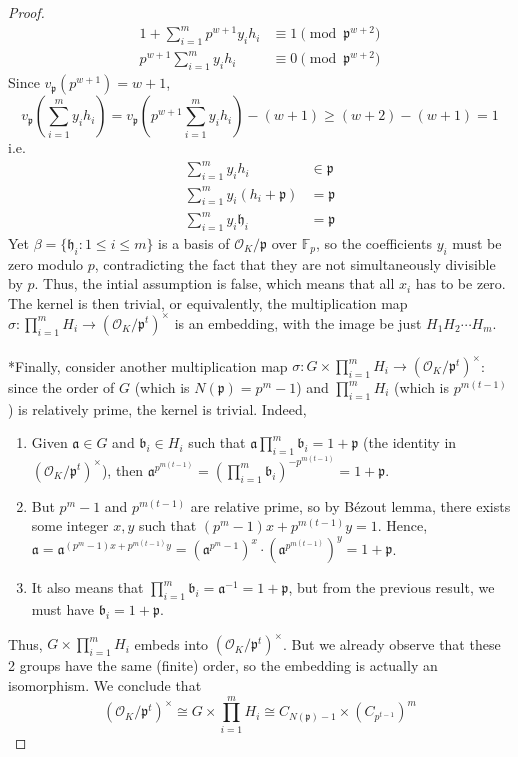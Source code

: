 \documentclass{treatise}
\begin{document}
\begin{proof}
\begin{align*}
1 + \sum_{i = 1}^m p^{w + 1} y_i h_i & \equiv 1 \pmod{\mathfrak{p}^{w + 2}} \\
p^{w + 1} \sum_{i = 1}^m y_i h_i & \equiv 0 \pmod{\mathfrak{p}^{w + 2}}
\end{align*}
Since $v_\mathfrak{p}(p^{w + 1}) = w + 1$,
$$v_\mathfrak{p} \left( \sum_{i = 1}^m y_i h_i \right) = v_\mathfrak{p} \left( p^{w + 1} \sum_{i = 1}^m y_i h_i \right) - (w + 1) \geq (w + 2) - (w + 1) = 1$$
i.e.
\begin{align*}
\sum_{i = 1}^m y_i h_i & \in \mathfrak{p} \\
\sum_{i = 1}^m y_i (h_i + \mathfrak{p}) & = \mathfrak{p} \\
\sum_{i = 1}^m y_i \mathfrak{h}_i & = \mathfrak{p}
\end{align*}
Yet $\beta = \{ \mathfrak{h}_i : 1 \leq i \leq m \}$ is a basis of $\mathcal{O}_K / \mathfrak{p}$ over $\mathbb{F}_p$, so the coefficients $y_i$ must be zero modulo $p$, contradicting the fact that they are not simultaneously divisible by $p$. Thus, the intial assumption is false, which means that all $x_i$ has to be zero. The kernel is then trivial, or equivalently, the multiplication map $\sigma: \prod_{i = 1}^m H_i \to (\mathcal{O}_K/\mathfrak{p}^t)^\times$ is an embedding, with the image be just $H_1 H_2 \cdots H_m$.
\\
\\
*Finally, consider another multiplication map $\sigma: G \times \prod_{i = 1}^m H_i \to (\mathcal{O}_K/\mathfrak{p}^t)^\times$: since the order of $G$ (which is $N(\mathfrak{p}) = p^m - 1$) and $\prod_{i = 1}^m H_i$ (which is $p^{m(t - 1)}$) is relatively prime, the kernel is trivial. Indeed, 
\begin{enumerate}
	\item Given $\mathfrak{a} \in G$ and $\mathfrak{b}_i \in H_i$ such that $\mathfrak{a} \prod_{i = 1}^m \mathfrak{b}_i = 1 + \mathfrak{p}$ (the identity in $(\mathcal{O}_K/\mathfrak{p}^t)^\times$), then $\mathfrak{a}^{p^{m(t - 1)}} = \left( \prod_{i = 1}^m \mathfrak{b}_i \right)^{-p^{m(t - 1)}} = 1 + \mathfrak{p}$.
	\item But $p^m - 1$ and $p^{m(t - 1)}$ are relative prime, so by Bézout lemma, there exists some integer $x, y$ such that $(p^m - 1)x + p^{m(t - 1)} y = 1$. Hence, $\mathfrak{a} = \mathfrak{a}^{(p^m - 1) x + p^{m(t - 1)} y} = \left( \mathfrak{a}^{p^m - 1} \right)^x \cdot \left( \mathfrak{a}^{p^{m (t - 1)}} \right)^y = 1 + \mathfrak{p}$.
	\item It also means that $\prod_{i = 1}^m \mathfrak{b}_i = \mathfrak{a}^{-1} = 1 + \mathfrak{p}$, but from the previous result, we must have $\mathfrak{b}_i = 1 + \mathfrak{p}$.
\end{enumerate}
Thus, $G \times \prod_{i = 1}^m H_i$ embeds into $(\mathcal{O}_K/\mathfrak{p}^t)^\times$. But we already observe that these 2 groups have the same (finite) order, so the embedding is actually an isomorphism. We conclude that
$$(\mathcal{O}_K/\mathfrak{p}^t)^\times \cong G \times \prod_{i = 1}^m H_i \cong C_{N(\mathfrak{p}) - 1} \times \left( C_{p^{t - 1}}\right)^m$$
\end{proof}
\end{document}
